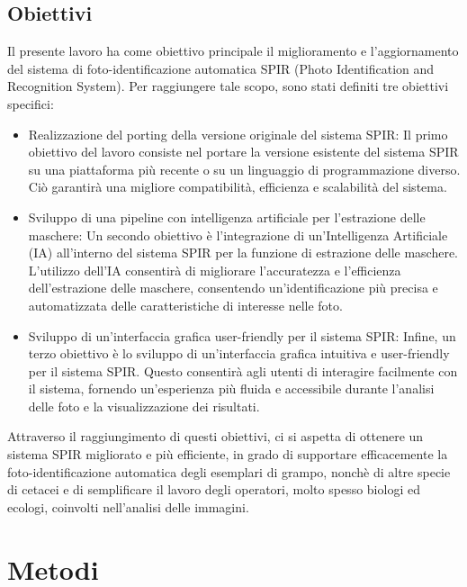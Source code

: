 \documentclass[a4paper,12pt]{report}
\begin{document}
  \section{Obiettivi}
  Il presente lavoro ha come obiettivo principale il miglioramento e l'aggiornamento del sistema di foto-identificazione automatica SPIR (Photo Identification and Recognition System). Per raggiungere tale scopo, sono stati definiti tre obiettivi specifici:
  \begin{itemize}
    \item Realizzazione del porting della versione originale del sistema SPIR:
    Il primo obiettivo del lavoro consiste nel portare la versione esistente del sistema SPIR su una piattaforma più recente o su un linguaggio di programmazione diverso. Ciò garantirà una migliore compatibilità, efficienza e scalabilità del sistema.
    \item Sviluppo di una pipeline con intelligenza artificiale per l'estrazione delle maschere:
    Un secondo obiettivo è l'integrazione di un'Intelligenza Artificiale (IA) all'interno del sistema SPIR per la funzione di estrazione delle maschere. L'utilizzo dell'IA consentirà di migliorare l'accuratezza e l'efficienza dell'estrazione delle maschere, consentendo un'identificazione più precisa e automatizzata delle caratteristiche di interesse nelle foto.
    \item Sviluppo di un'interfaccia grafica user-friendly per il sistema SPIR:
    Infine, un terzo obiettivo è lo sviluppo di un'interfaccia grafica intuitiva e user-friendly per il sistema SPIR. Questo consentirà agli utenti di interagire facilmente con il sistema, fornendo un'esperienza più fluida e accessibile durante l'analisi delle foto e la visualizzazione dei risultati.

  \end{itemize}
  Attraverso il raggiungimento di questi obiettivi, ci si aspetta di ottenere un sistema SPIR migliorato e più efficiente, in grado di supportare efficacemente la foto-identificazione automatica degli esemplari di grampo, nonchè di altre specie di cetacei e di semplificare il lavoro degli operatori, molto spesso biologi ed ecologi, coinvolti nell'analisi delle immagini.


\chapter{Metodi}
\end{document}
